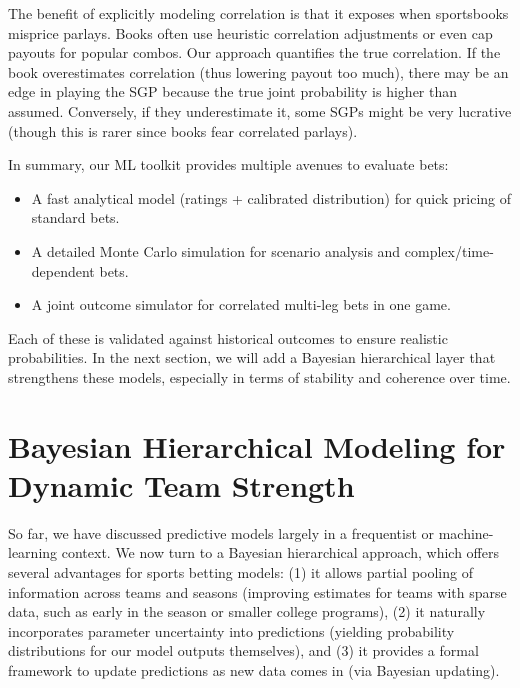 \documentclass[12pt]{article}
\begin{document}
The benefit of explicitly modeling correlation is that it exposes when sportsbooks misprice parlays. Books often use heuristic correlation adjustments or even cap payouts for popular combos. Our approach quantifies the true correlation. If the book overestimates correlation (thus lowering payout too much), there may be an edge in playing the SGP because the true joint probability is higher than assumed. Conversely, if they underestimate it, some SGPs might be very lucrative (though this is rarer since books fear correlated parlays).

In summary, our ML toolkit provides multiple avenues to evaluate bets:
\begin{itemize}
    \item A fast analytical model (ratings + calibrated distribution) for quick pricing of standard bets.
    \item A detailed Monte Carlo simulation for scenario analysis and complex/time-dependent bets.
    \item A joint outcome simulator for correlated multi-leg bets in one game.
\end{itemize}
Each of these is validated against historical outcomes to ensure realistic probabilities. In the next section, we will add a Bayesian hierarchical layer that strengthens these models, especially in terms of stability and coherence over time.

\section{Bayesian Hierarchical Modeling for Dynamic Team Strength}
So far, we have discussed predictive models largely in a frequentist or machine-learning context. We now turn to a Bayesian hierarchical approach, which offers several advantages for sports betting models: (1) it allows partial pooling of information across teams and seasons (improving estimates for teams with sparse data, such as early in the season or smaller college programs), (2) it naturally incorporates parameter uncertainty into predictions (yielding probability distributions for our model outputs themselves), and (3) it provides a formal framework to update predictions as new data comes in (via Bayesian updating).
\end{document}
